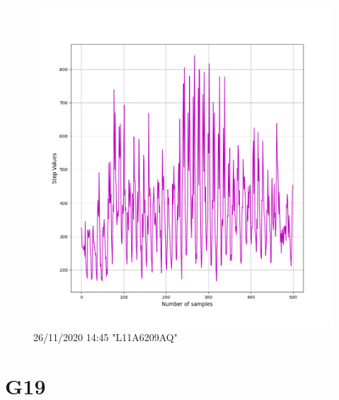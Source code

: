 \documentclass[hidelinks, 12pt, a4paper]{article}
\begin{document}
\begin{figure}[h!]
\centering
	\includegraphics[height=.38\textheight, width=\textwidth]{assets/session1/g18.png}
    \caption{26/11/2020 14:45 "L11A6209AQ"}
\end{figure}



\section{G19}
\end{document}

